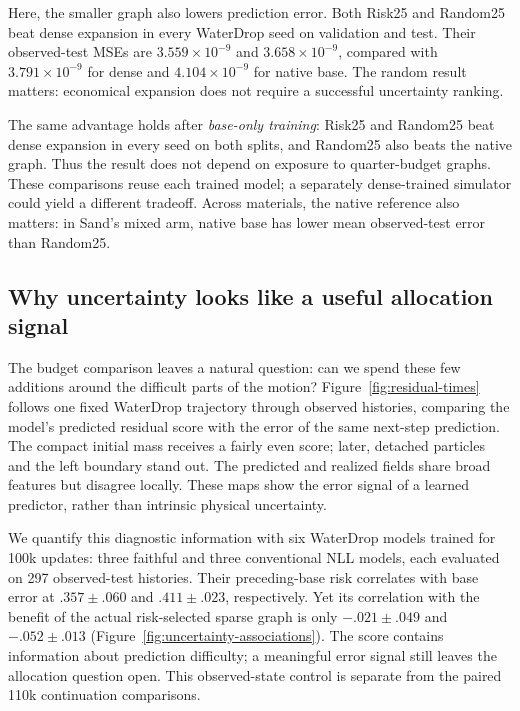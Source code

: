 Here, the smaller graph also lowers prediction error. Both Risk25 and Random25 beat dense expansion in every WaterDrop seed on validation and test. Their observed-test MSEs are $3.559\times10^{-9}$ and $3.658\times10^{-9}$, compared with $3.791\times10^{-9}$ for dense and $4.104\times10^{-9}$ for native base. The random result matters: economical expansion does not require a successful uncertainty ranking.

The same advantage holds after \emph{base-only training}: Risk25 and Random25 beat dense expansion in every seed on both splits, and Random25 also beats the native graph. Thus the result does not depend on exposure to quarter-budget graphs. These comparisons reuse each trained model; a separately dense-trained simulator could yield a different tradeoff. Across materials, the native reference also matters: in Sand's mixed arm, native base has lower mean observed-test error than Random25.



\subsection{Why uncertainty looks like a useful allocation signal}
The budget comparison leaves a natural question: can we spend these few additions around the difficult parts of the motion? Figure~\ref{fig:residual-times} follows one fixed WaterDrop trajectory through observed histories, comparing the model's predicted residual score with the error of the same next-step prediction. The compact initial mass receives a fairly even score; later, detached particles and the left boundary stand out. The predicted and realized fields share broad features but disagree locally. These maps show the error signal of a learned predictor, rather than intrinsic physical uncertainty.


We quantify this diagnostic information with six WaterDrop models trained for 100k updates: three faithful and three conventional NLL models, each evaluated on 297 observed-test histories. Their preceding-base risk correlates with base error at $.357\pm.060$ and $.411\pm.023$, respectively. Yet its correlation with the benefit of the actual risk-selected sparse graph is only $-.021\pm.049$ and $-.052\pm.013$ (Figure~\ref{fig:uncertainty-associations}). The score contains information about prediction difficulty; a meaningful error signal still leaves the allocation question open. This observed-state control is separate from the paired 110k continuation comparisons.

